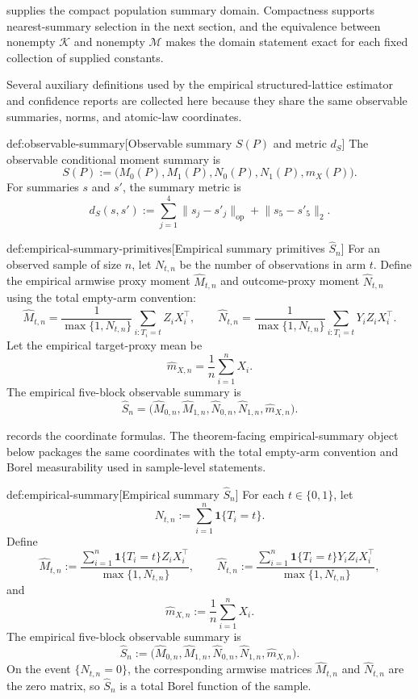 \documentclass[11pt]{article}
\begin{document}
 supplies the compact population summary domain. Compactness supports nearest-summary selection in the next section, and the equivalence between nonempty \(\mathcal K\) and nonempty \(\mathcal M\) makes the domain statement exact for each fixed collection of supplied constants.

Several auxiliary definitions used by the empirical structured-lattice estimator and confidence reports are collected here because they share the same observable summaries, norms, and atomic-law coordinates.

\begin{definitionv}{def:observable-summary}[Observable summary \(S(P)\) and metric \(d_S\)]
The observable conditional moment summary is
\[
S(P):=\bigl(M_0(P),M_1(P),N_0(P),N_1(P),m_X(P)\bigr).
\]
For summaries \(s\) and \(s'\), the summary metric is
\[
d_S(s,s')
:=
\sum_{j=1}^{4}\lVert s_j-s'_j\rVert_{\mathrm{op}}
+\lVert s_5-s'_5\rVert_2.
\]
\end{definitionv}

\begin{definitionv}{def:empirical-summary-primitives}[Empirical summary primitives \(\widehat S_n\)]
For an observed sample of size \(n\), let \(N_{t,n}\) be the number of observations in arm \(t\). Define the empirical armwise proxy moment \(\widehat M_{t,n}\) and outcome-proxy moment \(\widehat N_{t,n}\) using the total empty-arm convention:
\[
\widehat M_{t,n}
=
\frac{1}{\max\{1,N_{t,n}\}}
\sum_{i:T_i=t} Z_iX_i^\top,
\qquad
\widehat N_{t,n}
=
\frac{1}{\max\{1,N_{t,n}\}}
\sum_{i:T_i=t} Y_iZ_iX_i^\top .
\]
Let the empirical target-proxy mean be
\[
\widehat m_{X,n}
=
\frac{1}{n}\sum_{i=1}^n X_i .
\]
The empirical five-block observable summary is
\[
\widehat S_n
=
\bigl(
\widehat M_{0,n},
\widehat M_{1,n},
\widehat N_{0,n},
\widehat N_{1,n},
\widehat m_{X,n}
\bigr).
\]
\end{definitionv}

 records the coordinate formulas. The theorem-facing empirical-summary object below packages the same coordinates with the total empty-arm convention and Borel measurability used in sample-level statements.

\begin{definitionv}{def:empirical-summary}[Empirical summary \(\widehat S_n\)]
For each \(t\in\{0,1\}\), let
\[
N_{t,n}:=\sum_{i=1}^{n}\mathbf 1\{T_i=t\}.
\]
Define
\[
\widehat M_{t,n}
:=
\frac{\sum_{i=1}^{n}\mathbf 1\{T_i=t\}Z_iX_i^\top}{\max\{1,N_{t,n}\}},
\qquad
\widehat N_{t,n}
:=
\frac{\sum_{i=1}^{n}\mathbf 1\{T_i=t\}Y_iZ_iX_i^\top}{\max\{1,N_{t,n}\}},
\]
and
\[
\widehat m_{X,n}:=\frac{1}{n}\sum_{i=1}^{n}X_i.
\]
The empirical five-block observable summary is
\[
\widehat S_n
:=
\bigl(\widehat M_{0,n},\widehat M_{1,n},
\widehat N_{0,n},\widehat N_{1,n},\widehat m_{X,n}\bigr).
\]
On the event \(\{N_{t,n}=0\}\), the corresponding armwise matrices \(\widehat M_{t,n}\) and \(\widehat N_{t,n}\) are the zero matrix, so \(\widehat S_n\) is a total Borel function of the sample.
\end{definitionv}
\end{document}
